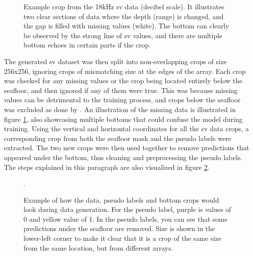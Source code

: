         \begin{figure}[H]
            \centering
            
            \caption[Missing values and bottom]{Example crop from the 18kHz \gls{sv} data (decibel scale). It illustrates two clear sections of data where the depth (range) is changed, and the gap is filled with missing values (white). The bottom can clearly be observed by the strong line of \gls{sv} values, and there are multiple bottom echoes in certain parts if the crop.}
          	\medskip 
            \label{data_bottom_nans_fig}
        \end{figure}
        
        
        The generated \gls{sv} dataset was then split into non-overlapping crops of size 256x256, ignoring crops of mismatching size at the edges of the array. Each crop was checked for any missing values or the crop being located entirely below the seafloor, and then ignored if any of them were true. This was because missing values can be detrimental to the training process, and crops below the seafloor was excluded as done by \citeauthor{brautaset2020acoustic}\cite{brautaset2020acoustic}. An illustration of the missing data is illustrated in figure \ref{data_bottom_nans_fig}, also showcasing multiple bottoms that could confuse the model during training. Using the vertical and horizontal coordinates for all the \gls{sv} data crops, a corresponding crop from both the seafloor mask and the pseudo labels were extracted. The two new crops were then used together to remove predictions that appeared under the bottom, thus cleaning and preprocessing the pseudo labels. The steps explained in this paragraph are also visualized in figure \ref{crop_extract_fig}.
        \begin{figure}[H]
            \centering
            
            \caption[Data, label and bottom crop extraction and interaction]{Example of how the data, pseudo labels and bottom crops would look during data generation. For the pseudo label, purple is values of 0 and yellow value of 1. In the pseudo labels, you can see that some predictions under the seafloor are removed.  Size is shown in the lower-left corner to make it clear that it is a crop of the same size from the same location, but from different arrays.}.
          	\medskip 
            \label{crop_extract_fig}
        \end{figure}
        
